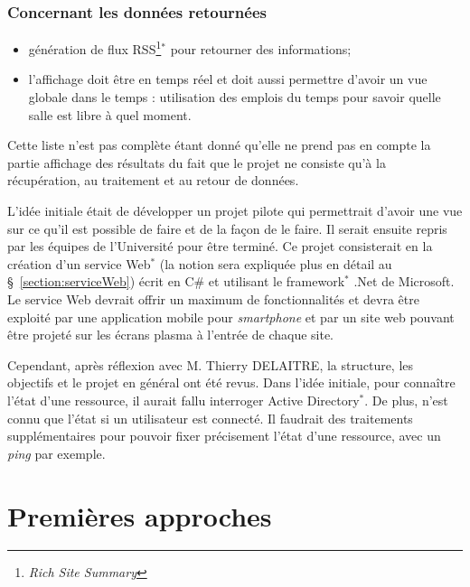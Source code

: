 \subsubsection{Concernant les donn\'ees retourn\'ees}

\begin{itemize}
	\item g\'en\'eration de flux RSS\protect\footnote{\textit{Rich Site Summary}}$^*$ pour retourner des informations;
	\item l'affichage doit \^etre en temps r\'eel et doit aussi permettre d'avoir un vue globale dans le temps : utilisation des emplois du temps pour savoir quelle salle est libre \`a quel moment.

\end{itemize}

\vspace{0.20cm}

Cette liste n'est pas compl\`ete \'etant donn\'e qu'elle ne prend pas en compte la partie \og{}affichage\fg{} des r\'esultats du fait que le projet ne consiste qu'\`a la r\'ecup\'eration, au traitement et au retour de donn\'ees.

L'id\'ee initiale \'etait de d\'evelopper un projet pilote qui permettrait d'avoir une vue sur ce qu'il est possible de faire et de la fa\c{c}on de le faire.
Il serait ensuite repris par les \'equipes de l'Universit\'e pour \^etre termin\'e.
Ce projet consisterait en la cr\'eation d'un service Web$^*$ (la notion sera expliqu\'ee plus en d\'etail au \S~\ref{section:serviceWeb}) \'ecrit en C\# et utilisant le framework$^*$ .Net de Microsoft.
Le service Web devrait offrir un maximum de fonctionnalit\'es et devra \^etre exploit\'e par une application mobile pour \textit{smartphone} et par un site web pouvant \^etre projet\'e sur les \'ecrans plasma \`a l'entr\'ee de chaque site.

Cependant, apr\`es r\'eflexion avec M. Thierry DELAITRE, la structure, les objectifs et le projet en g\'en\'eral ont \'et\'e revus.
Dans l'id\'ee initiale, pour conna\^itre l'\'etat d'une ressource, il aurait fallu interroger Active Directory$^*$. 
De plus, n'est connu que l'\'etat si un utilisateur est connect\'e.
Il faudrait des traitements suppl\'ementaires pour pouvoir fixer pr\'ecisement l'\'etat d'une ressource, avec un \textit{ping} par exemple.

\section{Premi\`eres approches}


